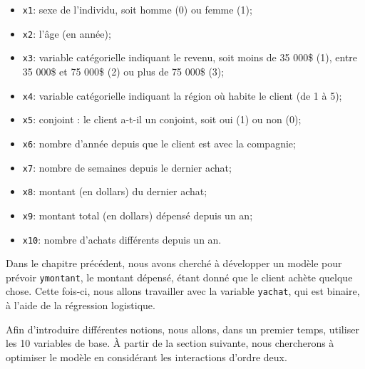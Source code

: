 \documentclass[
  11pt,
  letterpaper,
]{scrbook}
\providecommand{\tightlist}{%
  \setlength{\itemsep}{0pt}\setlength{\parskip}{0pt}}\usepackage{longtable,booktabs,array}
\theoremstyle{definition}
\theoremstyle{remark}
\begin{document}
\begin{itemize}
\tightlist
\item
  \texttt{x1}: sexe de l'individu, soit homme (0) ou femme (1);
\item
  \texttt{x2}: l'âge (en année);
\item
  \texttt{x3}: variable catégorielle indiquant le revenu, soit moins de
  35 000\$ (1), entre 35 000\$ et 75 000\$ (2) ou plus de 75 000\$ (3);
\item
  \texttt{x4}: variable catégorielle indiquant la région où habite le
  client (de 1 à 5);
\item
  \texttt{x5}: conjoint : le client a-t-il un conjoint, soit oui (1) ou
  non (0);
\item
  \texttt{x6}: nombre d'année depuis que le client est avec la
  compagnie;
\item
  \texttt{x7}: nombre de semaines depuis le dernier achat;
\item
  \texttt{x8}: montant (en dollars) du dernier achat;
\item
  \texttt{x9}: montant total (en dollars) dépensé depuis un an;
\item
  \texttt{x10}: nombre d'achats différents depuis un an.
\end{itemize}

Dans le chapitre précédent, nous avons cherché à développer un modèle
pour prévoir \texttt{ymontant}, le montant dépensé, étant donné que le
client achète quelque chose. Cette fois-ci, nous allons travailler avec
la variable \texttt{yachat}, qui est binaire, à l'aide de la régression
logistique.

Afin d'introduire différentes notions, nous allons, dans un premier
temps, utiliser les 10 variables de base. À partir de la section
suivante, nous chercherons à optimiser le modèle en considérant les
interactions d'ordre deux.
\end{document}

